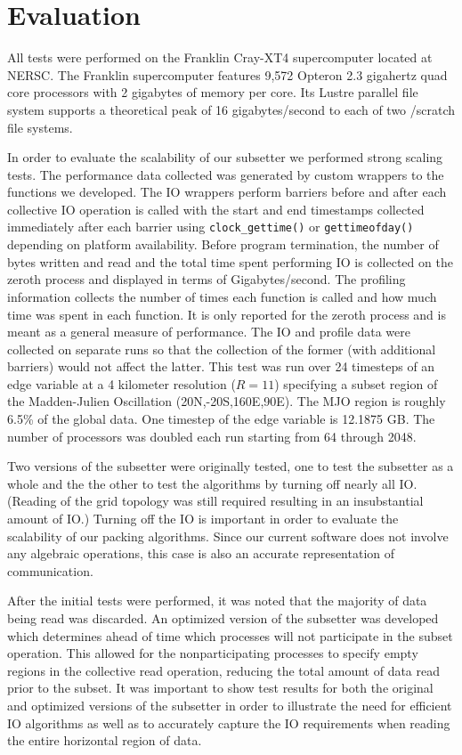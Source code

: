 \section{Evaluation}
\label{section:evaluation}

All tests were performed on the Franklin Cray-XT4 supercomputer\cite{franklin}
located at NERSC\cite{NERSC}.  The Franklin supercomputer features 9,572
Opteron 2.3 gigahertz quad core processors with 2 gigabytes of memory per
core.  Its Lustre parallel file system supports a theoretical peak of 16
gigabytes/second to each of two /scratch file systems.

In order to evaluate the scalability of our subsetter we performed strong
scaling tests.  The performance data collected was generated by custom
wrappers to the functions we developed.  The IO wrappers perform barriers
before and after each collective IO operation is called with the start and end
timestamps collected immediately after each barrier using
\verb=clock_gettime()= or \verb=gettimeofday()= depending on platform
availability.  Before program termination, the number of bytes written and
read and the total time spent performing IO is collected on the zeroth process
and displayed in terms of Gigabytes/second.  The profiling information
collects the number of times each function is called and how much time was
spent in each function.  It is only reported for the zeroth process and is
meant as a general measure of performance.  The IO and profile data were
collected on separate runs so that the collection of the former (with
additional barriers) would not affect the latter.  This test was run over 24
timesteps of an edge variable at a 4 kilometer resolution ($R=11$) specifying
a subset region of the Madden-Julien Oscillation\cite{MJO}
(20N,-20S,160E,90E).  The MJO region is roughly 6.5\% of the global data.  One
timestep of the edge variable is 12.1875 GB.  The number of processors was
doubled each run starting from 64 through 2048.

Two versions of the subsetter were originally tested, one to test the
subsetter as a whole and the the other to test the algorithms by turning off
nearly all IO.  (Reading of the grid topology was still required resulting in
an insubstantial amount of IO.)  Turning off the IO is important in order to
evaluate the scalability of our packing algorithms.  Since our current
software does not involve any algebraic operations, this case is also an
accurate representation of communication.

After the initial tests were performed, it was noted that the majority of data
being read was discarded.  An optimized version of the subsetter was developed
which determines ahead of time which processes will not participate in the
subset operation.  This allowed for the nonparticipating processes to specify
empty regions in the collective read operation, reducing the total amount of
data read prior to the subset.  It was important to show test results for both
the original and optimized versions of the subsetter in order to illustrate
the need for efficient IO algorithms as well as to accurately capture the IO
requirements when reading the entire horizontal region of data.

